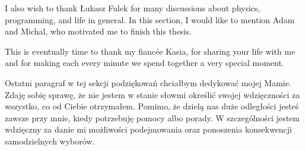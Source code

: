I also wish to thank Łukasz Fulek for many discussions about physics, programming, and life in general. In this section, I would like to mention Adam and Michal, who motivated me to finish this thesis. 

This is eventually time to thank my fiancée Kasia, for sharing your life with me  and for making each every minute we spend together a very special moment.  

Ostatni paragraf w tej sekcji podziękowań chciałbym dedykować mojej Mamie. Zdaję sobię sprawę, że nie jestem w stanie słowmi określić swojej wdzięczności za wszystko, co od Ciebie otrzymałem. Pomimo, że dzielą nas duże odległości jesteś zawsze przy mnie, kiedy potrzebuję pomocy albo porady. W szczególności jestem wdzięczny za danie mi możliwości podejmowania oraz ponoszenia konsekwencji samodzielnych wyborów.  
